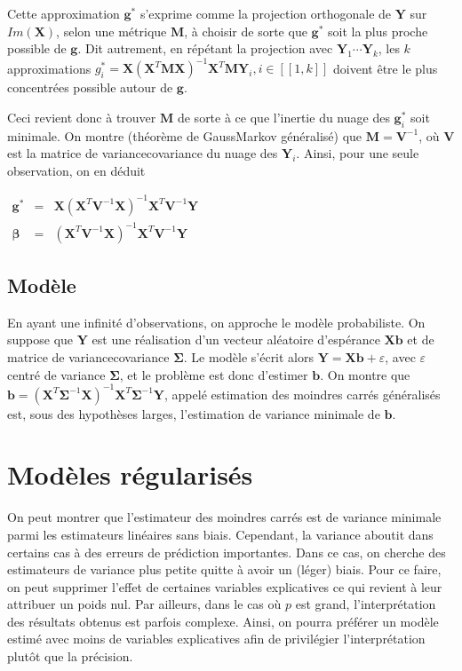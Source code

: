 \documentclass[letterpaper,10pt,french]{sphinxmanual}
\begin{document}
\sphinxAtStartPar
Cette approximation \(\mathbf g^*\) s’exprime comme la projection orthogonale de \(\mathbf Y\) sur \(Im(\mathbf X)\), selon une métrique \(\mathbf M\), à choisir de sorte que \(\mathbf g^*\) soit la plus proche possible de \(\mathbf g\). Dit autrement, en répétant la projection avec \(\mathbf Y_1\cdots \mathbf Y_k\), les \(k\) approximations \(g^*_i=\mathbf X (\mathbf X^T\mathbf M\mathbf X)^{-1} \mathbf X^T \mathbf M \mathbf Y_i, i\in[\![1,k]\!]\) doivent être le plus concentrées possible autour de \(\mathbf g\).

\sphinxAtStartPar
Ceci revient donc à trouver \(\mathbf M\) de sorte à ce que l’inertie du nuage des \(\mathbf g_i^*\) soit minimale. On montre (théorème de Gauss\sphinxhyphen{}Markov généralisé) que \(\mathbf M=\mathbf V^{-1}\), où \(\mathbf V\) est la matrice de variance\sphinxhyphen{}covariance du nuage des \(\mathbf Y_i\). Ainsi, pour une seule observation, on en déduit

\sphinxAtStartPar
\(\begin{eqnarray*}
\mathbf g^*&=&\mathbf X(\mathbf X^T\mathbf V^{-1}\mathbf X)^{-1}\mathbf X^T\mathbf V^{-1}\mathbf Y\\
\boldsymbol \beta&=&(\mathbf X^T\mathbf V^{-1}\mathbf X)^{-1}\mathbf X^T\mathbf V^{-1}\mathbf Y
\end{eqnarray*}\)


\subsection{Modèle}
\label{\detokenize{regression:id1}}
\sphinxAtStartPar
En ayant une infinité d’observations, on approche le modèle probabiliste. On suppose que \(\mathbf Y\) est une réalisation d’un vecteur aléatoire d’espérance \(\mathbf X\mathbf b\) et de matrice de variance\sphinxhyphen{}covariance \(\boldsymbol\Sigma\). Le modèle s’écrit alors  \(\mathbf Y=\mathbf X\mathbf b+\varepsilon\), avec \(\varepsilon\) centré de variance \(\boldsymbol\Sigma\), et le problème est donc d’estimer \(\mathbf b\). On montre que  \(\mathbf b = (\mathbf X^T \boldsymbol\Sigma^{-1}\mathbf X)^{-1}\mathbf X^T\boldsymbol\Sigma^{-1}\mathbf Y\), appelé estimation des moindres carrés généralisés est, sous des hypothèses larges, l’estimation de variance minimale de \(\mathbf b\).


\section{Modèles régularisés}
\label{\detokenize{regression:modeles-regularises}}
\sphinxAtStartPar
On peut montrer que l’estimateur des moindres carrés est de variance minimale parmi les estimateurs linéaires sans biais. Cependant, la variance aboutit dans certains cas à des erreurs de prédiction importantes. Dans ce cas, on cherche des estimateurs de variance plus petite quitte à avoir un (léger) biais. Pour ce faire, on peut supprimer l’effet de certaines variables explicatives ce qui revient à leur attribuer un poids nul.
Par ailleurs, dans le cas où \(p\) est grand, l’interprétation des résultats obtenus est parfois complexe. Ainsi, on pourra préférer un modèle estimé avec moins de variables explicatives afin de privilégier l’interprétation plutôt que la précision.
\end{document}
